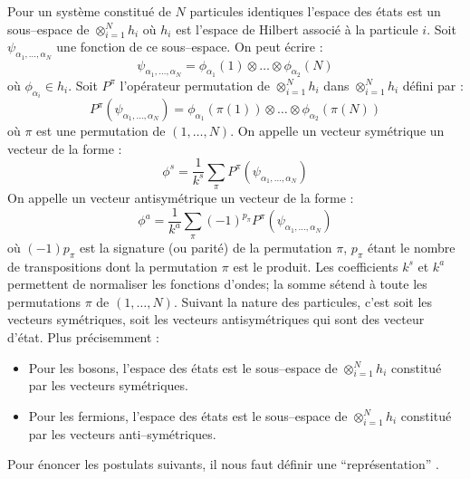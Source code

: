 \documentclass[12pt]{book}
\begin{document}
\begin{exmp}\label{exmppauli}
Pour un syst\`eme constitu\'e de $N$ particules identiques 
l'espace des \'etats est un sous--espace de
$\otimes_{i=1}^N h_i$ o\`u $h_i$ est l'espace de Hilbert associ\'e \`a
la particule $i$.
Soit $\psi_{\alpha_1,\dots,\alpha_N}$ une fonction de ce sous--espace. On peut
\'ecrire :
\begin{equation}
\psi_{\alpha_1,\dots,\alpha_N} = \phi_{\alpha_1}(1)\otimes \dots
\otimes\phi_{\alpha_2}(N) 
\end{equation}
o\`u $\phi_{\alpha_i}\in h_i$.
Soit $P^{\pi}$ l'op\'erateur permutation de
$\otimes_{i=1}^N h_i$ dans 
$\otimes_{i=1}^N h_i$ d\'efini par :
\begin{equation}
P^{\pi}(\psi_{\alpha_1,\dots,\alpha_N})=
\phi_{\alpha_1}(\pi(1))\otimes \dots 
\otimes\phi_{\alpha_2}(\pi(N)) 
\end{equation}
o\`u $\pi$ est une permutation de $(1,\dots,N)$.
On appelle un vecteur sym\'etrique un vecteur de la forme :
\begin{equation}
\phi^s=\frac{1}{k^s}\sum_\pi P^\pi(\psi_{\alpha_1,\dots,\alpha_N})
\end{equation}
On appelle un vecteur antisym\'etrique un vecteur de la forme :
\begin{equation}
\phi^a=\frac{1}{k^a}\sum_\pi (-1)^{p_\pi}
P^\pi(\psi_{\alpha_1,\dots,\alpha_N}) 
\end{equation}
o\`u $(-1)p_\pi$ est la signature  (ou parit\'e) de la
permutation $\pi$, $p_\pi$ \'etant le nombre 
de transpositions dont la permutation $\pi$ est le produit.
Les coefficients $k^s$ et $k^a$ permettent de normaliser les fonctions
d'ondes; la somme
s\'etend \`a toute les permutations  $\pi$ de $(1,\dots,N)$.
Suivant la nature des particules, c'est soit les vecteurs sym\'etriques, soit
les vecteurs antisym\'etriques qui sont des vecteur d'\'etat. Plus
pr\'ecisemment :
\begin{itemize}
\item Pour les bosons, l'espace des \'etats est le sous--espace de
$\otimes_{i=1}^N h_i$ constitu\'e par les vecteurs sym\'etriques.
\item Pour les fermions, l'espace des \'etats est le sous--espace de
$\otimes_{i=1}^N h_i$ constitu\'e par les vecteurs anti--sym\'etriques.
\end{itemize}
\end{exmp}
Pour \'enoncer les postulats suivants, il nous faut d\'efinir une
``repr\'esentation'' \cite{ma:equad:Dautray5,ph:mecaq:Cohen73}.
\end{document}
